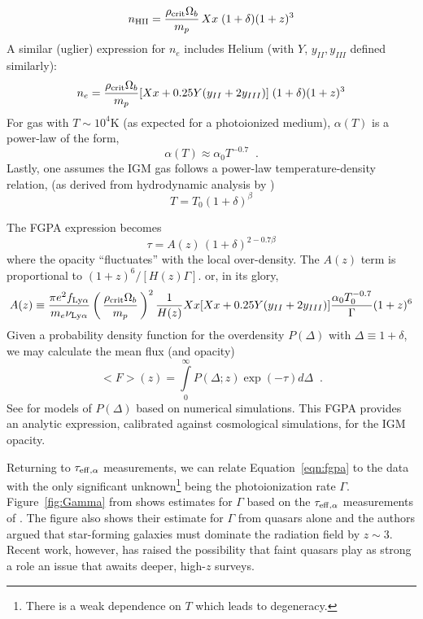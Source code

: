 \documentclass[graybox]{svmult}
\def\ltp{\left ( \,}
\def\rtp{\, \right  ) }
\def\intl{\int\limits}
\begin{document}
\begin{equation}
n_{\rm HII} = \frac{\rho_{\rm crit} \Omega_b}{m_p} \, X x \; (1+\delta) (1+z)^3
\end{equation}
A similar (uglier) expression for $n_e$ includes Helium 
(with $Y$, $y_{II}, y_{III}$ defined similarly):
\begin{equation}
n_e = \frac{\rho_{\rm crit} \Omega_b}{m_p} [Xx + 0.25Y(y_{II} + 2y_{III})] \; (1+\delta) (1+z)^3
\end{equation}
For gas with $T \sim 10^4$K (as expected for a photoionized medium),
$\alpha(T)$ is a power-law of the form,
\begin{equation}
\alpha(T) \approx \alpha_0 T^{-0.7} \;\; .
\end{equation}
Lastly, one assumes the IGM gas follows a power-law temperature-density
relation, (as derived from hydrodynamic analysis by \cite{HuiGnedin97})
\begin{equation}
T = T_0 (1+\delta)^\beta
\label{eqn:rhoT}
\end{equation}

The FGPA expression becomes
\begin{equation}
\tau = A(z) \, (1+\delta)^{2 - 0.7 \beta}
\end{equation}
where the opacity ``fluctuates'' with the local over-density.
The $A(z)$ term is proportional to  $(1+z)^6 / [H(z) \Gamma]$.
or, in its glory,
\begin{equation}
A(z) \equiv \frac{\pi e^2 f_{\rm Ly\alpha}}{m_e \nu_{\rm Ly\alpha}}
\ltp \frac{\rho_{\rm crit} \Omega_b}{m_p} \rtp^2 
\frac{1}{H(z)} Xx [Xx + 0.25Y(y_{II} + 2y_{III})] \frac{\alpha_0 T_0^{-0.7}}{\Gamma}
(1+z)^6
\end{equation}
Given a probability density function for the overdensity
$P(\Delta)$ with $\Delta \equiv 1 + \delta$, we 
may calculate the mean flux (and opacity)
\begin{equation}
<F>(z) = \intl_0^\infty P(\Delta; z) \exp(-\tau) d\Delta \;\; .
\label{eqn:fgpa}
\end{equation}
See \cite{miralda00} for models of $P(\Delta)$
based on numerical simulations.
This FGPA provides an analytic expression, calibrated
against cosmological simulations, for the IGM opacity.

Returning to $\tau_{\rm eff,\alpha}$ measurements,
we can relate Equation~\ref{eqn:fgpa} to the data
with the only significant unknown\footnote{There is a
weak dependence on $T$ which leads to degeneracy.} 
being the photoionization rate $\Gamma$.
Figure~\ref{fig:Gamma} from \cite{flh+08b}
shows estimates for $\Gamma$
based on the $\tau_{\rm eff,\alpha}$ measurements of 
\cite{fpl+08}.  The figure also shows their  
estimate for $\Gamma$ from quasars alone and the
authors argued that star-forming galaxies
must dominate the radiation field by $z \sim 3$.
Recent work, however, has raised the possibility
that faint quasars play as strong a role
\cite{giallongo+15,madau15} an issue that awaits
deeper, high-$z$ surveys.
\end{document}
